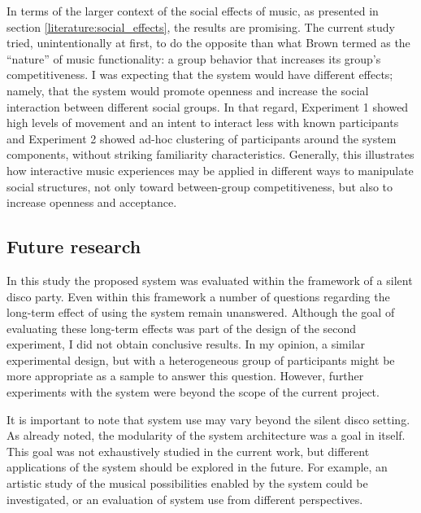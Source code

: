 \documentclass[a4paper,11pt]{article}
\begin{document}
{In terms of the larger context of the social effects of music, as presented in section \ref{literature:social_effects}, the results are promising.
The current study tried, unintentionally at first, to do the opposite than what Brown termed as the ``nature'' of music functionality: a group behavior that increases its group's competitiveness.
I was expecting that the system would have different effects; namely, that the system would promote openness and increase the social interaction between different social groups.
In that regard, Experiment 1 showed high levels of movement and an intent to interact less with known participants and Experiment 2 showed ad-hoc clustering of participants around the system components, without striking familiarity characteristics.
Generally, this illustrates how interactive music experiences may be applied in different ways to manipulate social structures, not only toward between-group competitiveness, but also to increase openness and acceptance.

\subsection{Future research}

In this study the proposed system was evaluated within the framework of a silent disco party.
Even within this framework a number of questions regarding the long-term effect of using the system remain unanswered.
Although the goal of evaluating these long-term effects was part of the design of the second experiment, I did not obtain conclusive results.
In my opinion, a similar experimental design, but with a heterogeneous group of participants might be more appropriate as a sample to answer this question.
However, further experiments with the system were beyond the scope of the current project.

It is important to note that system use may vary beyond the silent disco setting.
As already noted, the modularity of the system architecture was a goal in itself.
This goal was not exhaustively studied in the current work, but different applications of the system should be explored in the future.
For example, an artistic study of the musical possibilities enabled by the system could be investigated, or an evaluation of system use from different perspectives.

}
\end{document}
